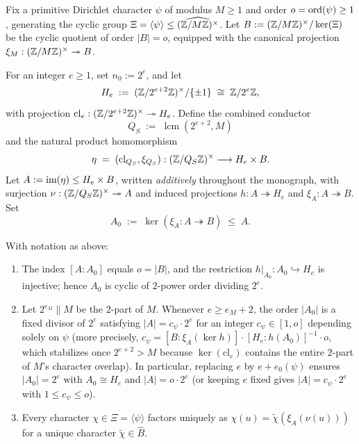 Fix a primitive Dirichlet character $\psi$ of modulus $M \ge 1$ and order $o = \operatorname{ord}(\psi) \ge 1$, generating the cyclic group $\Xi = \langle \psi \rangle \le \widehat{(\mathbb{Z}/M\mathbb{Z})^\times}$. Let $B := (\mathbb{Z}/M\mathbb{Z})^\times / \ker(\Xi)$ be the cyclic quotient of order $|B| = o$, equipped with the canonical projection $\xi_M : (\mathbb{Z}/M\mathbb{Z})^\times \twoheadrightarrow B$.

For an integer $e \ge 1$, set $n_0 := 2^e$, and let
\[
  H_e \;:=\; (\mathbb{Z}/2^{e+2}\mathbb{Z})^\times / \{\pm 1\} \;\cong\; \mathbb{Z} / 2^e \mathbb{Z},
\]
with projection $\mathrm{cl}_e : (\mathbb{Z}/2^{e+2}\mathbb{Z})^\times \twoheadrightarrow H_e$. Define the combined conductor
\[
  Q_S \;:=\; \operatorname{lcm}(2^{e+2}, M)
\]
and the natural product homomorphism
\[
  \eta \;=\; (\mathrm{cl}_{Q_S}, \xi_{Q_S}) : (\mathbb{Z}/Q_S\mathbb{Z})^\times \longrightarrow H_e \times B.
\]
Let $A := \operatorname{im}(\eta) \le H_e \times B$, written \emph{additively} throughout the monograph, with surjection $\nu : (\mathbb{Z}/Q_S\mathbb{Z})^\times \twoheadrightarrow A$ and induced projections $h : A \twoheadrightarrow H_e$ and $\xi_A : A \twoheadrightarrow B$. Set
\[
  A_0 \;:=\; \ker(\xi_A : A \twoheadrightarrow B) \;\le\; A.
\]

\begin{lemma}
\label{lem:03:frame-structure}
With notation as above:
\begin{enumerate}[label=\textup{(\roman*)}]
\item The index $[A : A_0]$ equals $o = |B|$, and the restriction $h|_{A_0} : A_0 \hookrightarrow H_e$ is injective; hence $A_0$ is cyclic of $2$-power order dividing $2^e$.
\item Let $2^{e_M} \parallel M$ be the $2$-part of $M$. Whenever $e \ge e_M + 2$, the order $|A_0|$ is a fixed divisor of $2^e$ satisfying $|A| = c_\psi \cdot 2^e$ for an integer $c_\psi \in [1, o]$ depending solely on $\psi$ (more precisely, $c_\psi = [B : \xi_A(\ker h)] \cdot [H_e : h(A_0)]^{-1} \cdot o$, which stabilizes once $2^{e+2} > M$ because $\ker(\mathrm{cl}_e)$ contains the entire $2$-part of $M$'s character overlap). In particular, replacing $e$ by $e + e_0(\psi)$ ensures $|A_0| = 2^{e}$ with $A_0 \cong H_e$ and $|A| = o \cdot 2^e$ (or keeping $e$ fixed gives $|A| = c_\psi \cdot 2^e$ with $1 \le c_\psi \le o$).
\item Every character $\chi \in \Xi = \langle \psi \rangle$ factors uniquely as $\chi(u) = \widetilde{\chi}(\xi_A(\nu(u)))$ for a unique character $\widetilde{\chi} \in \widehat{B}$.
\end{enumerate}
\end{lemma}

